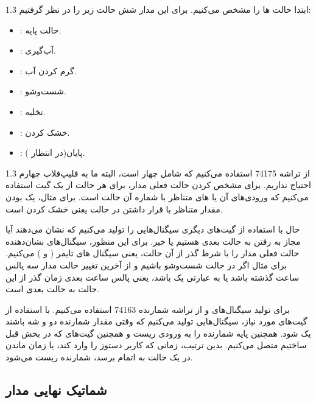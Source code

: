 \documentclass[a4paper,12pt]{article}
\numberwithin{figure}{subsection}
\begin{document}
\begin{spacing}{1.3}
ابتدا حالت ها را مشخص می‌کنیم. برای این مدار شش حالت زیر را در نظر گرفتیم:
\end{spacing}

\begin{itemize}
\item {}: حالت پایه.
\item {}: آب‌گیری.
\item {}: گرم کردن آب.
\item {}: شست‌وشو.
\item {}: تخلیه.
\item {}: خشک کردن.
\item {}: پایان(در انتظار ).
\end{itemize}

\begin{spacing}{1.3}
از تراشه 74175 استفاده می‌کنیم که شامل چهار  است، البته ما به فلیپ‌فلاپ چهارم احتیاج نداریم. برای مشخص کردن حالت فعلی مدار، برای هر حالت از یک گیت  استفاده می‌کنیم که ورودی‌های آن  یا  های متناظر با شماره آن حالت است. برای مثال، یک بودن مقدار  متناظر با قرار داشتن در حالت  یعنی خشک کردن است.

حال با استفاده از گیت‌های  دیگری سیگنال‌هایی را تولید می‌کنیم که نشان می‌دهند آیا مجاز به رفتن به حالت بعدی هستیم یا خیر. برای این منظور، سیگنال‌های نشان‌دهنده حالت فعلی مدار را با شرط گذر از آن حالت، یعنی سیگنال های تایمر ( و )  می‌کنیم. برای مثال اگر در حالت شست‌وشو باشیم و از آخرین تغییر حالت مدار سه پالس ساعت گذشته باشد یا به عبارتی  یک باشد، یعنی پالس ساعت بعدی زمان گذر از این حالت به حالت بعدی است.

برای تولید سیگنال‌های  و  از تراشه شمارنده 74163 استفاده می‌کنیم. با استفاده از گیت‌های مورد نیاز، سیگنال‌هایی تولید می‌کنیم که وقتی مقدار شمارنده دو و شه باشند یک شود. همچنین پایه  شمارنده را به ورودی ریست و همچنین گیت‌های  که در بخش قبل ساختیم متصل می‌کنیم. بدین ترتیب، زمانی که کاربر دستوز  را وارد کند، یا زمان ماندن در یک حالت به اتمام برسد، شمارنده ریست می‌شود.
\end{spacing}

\newpage

\subsection{شماتیک نهایی مدار}
\label{subsec:imp-detail-1}
\leavevmode\par
\vspace{0.2cm}
\end{document}

